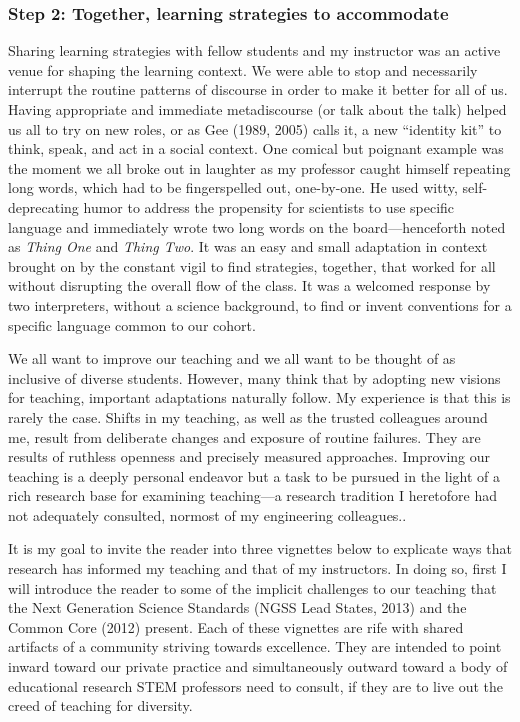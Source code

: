 \documentclass[11.5pt]{sig-alternate} %
\begin{document}
\begin{large}
\subsubsection*{Step 2: Together, learning strategies to accommodate}

Sharing learning strategies with fellow students and my instructor was an active venue for shaping the learning context.  We were able to stop and necessarily interrupt the routine patterns of discourse in order to make it better for all of us.  Having appropriate and immediate metadiscourse (or talk about the talk) helped us all to try on new roles, or as Gee (1989, 2005) calls it, a new “identity kit” to think, speak, and act in a social context.  One comical but poignant example was the moment we all broke out in laughter as my professor caught himself repeating long words, which had to be fingerspelled out, one-by-one.  He used witty, self-deprecating humor to address the propensity for scientists to use specific language and immediately wrote two long words on the board—henceforth noted as \textit{Thing One} and \textit{Thing Two}. It was an easy and small adaptation in context brought on by the constant vigil to find strategies, together, that worked for all without disrupting the overall flow of the class.  It was a welcomed response by two interpreters, without a science background, to find or invent conventions for a specific language common to our cohort. 

We all want to improve our teaching and we all want to be thought of as inclusive of diverse students.  However, many think that by adopting new visions for teaching, important adaptations naturally follow.  My experience is that this is rarely the case.  Shifts in my teaching, as well as the trusted colleagues around me, result from deliberate changes and exposure of routine failures.  They are results of ruthless openness and precisely measured approaches.  Improving our teaching is a deeply personal endeavor but a task to be pursued in the light of a rich research base for examining teaching—a research tradition I heretofore had not adequately consulted, normost of my engineering colleagues.. 

It is my goal to invite the reader into three vignettes below to explicate ways that research has informed my teaching and that of my instructors.  In doing so, first I will introduce the reader to some of the implicit challenges to our teaching that the Next Generation Science Standards (NGSS Lead States, 2013) and the Common Core (2012) present. Each of these vignettes are rife with shared artifacts of a community striving towards excellence.  They are intended to point inward toward our private practice and simultaneously outward toward a body of educational research STEM professors need to consult, if they are to live out the creed of teaching for diversity.


\end{large}
\end{document}
